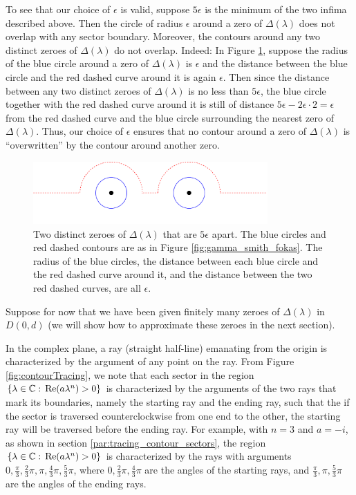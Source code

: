 \documentclass[11pt, oneside, a4paper]{article}
\begin{document}
To see that our choice of $\epsilon$ is valid, suppose $5\epsilon$ is the minimum of the two infima described above. Then the circle of radius $\epsilon$ around a zero of $\Delta(\lambda)$ does not overlap with any sector boundary. Moreover, the contours around any two distinct zeroes of $\Delta(\lambda)$ do not overlap. Indeed: In Figure \ref{fig:epsilon}, suppose the radius of the blue circle around a zero of $\Delta(\lambda)$ is $\epsilon$ and the distance between the blue circle and the red dashed curve around it is again $\epsilon$. Then since the distance between any two distinct zeroes of $\Delta(\lambda)$ is no less than $5\epsilon$, the blue circle together with the red dashed curve around it is still of distance $5\epsilon-2\epsilon\cdot 2 = \epsilon$ from the red dashed curve and the blue circle surrounding the nearest zero of $\Delta(\lambda)$. Thus, our choice of $\epsilon$ ensures that no contour around a zero of $\Delta(\lambda)$ is ``overwritten'' by the contour around another zero.

\begin{figure}[htpb!]
    \centering
    \includegraphics[width=0.8\textwidth]{epsilon_ps.png}
    \caption{Two distinct zeroes of $\Delta(\lambda)$ that are $5\epsilon$ apart. The blue circles and red dashed contours are as in Figure \ref{fig:gamma_smith_fokas}. The radius of the blue circles, the distance between each blue circle and the red dashed curve around it, and the distance between the two red dashed curves, are all $\epsilon$.}
    \label{fig:epsilon}
\end{figure}

Suppose for now that we have been given finitely many zeroes of $\Delta(\lambda)$ in $D(0, d)$ (we will show how to approximate these zeroes in the next section).

In the complex plane, a ray (straight half-line) emanating from the origin is characterized by the argument of any point on the ray. From Figure \ref{fig:contourTracing}, we note that each sector in the region $\{\lambda\in\mathbb C:\, \mathrm{Re}(a\lambda^n)>0\}$ is characterized by the arguments of the two rays that mark its boundaries, namely the starting ray and the ending ray, such that the if the sector is traversed counterclockwise from one end to the other, the starting ray will be traversed before the ending ray. For example, with $n=3$ and $a=-i$, as shown in section \ref{par:tracing_contour_sectors}, the region $\{\lambda\in\mathbb C:\, \mathrm{Re}(a\lambda^n)>0\}$ is characterized by the rays with arguments $0, \frac{\pi}{3}, \frac{2}{3}\pi, \pi, \frac{4}{3}\pi, \frac{5}{3}\pi$, where $0, \frac{2}{3}\pi, \frac{4}{3}\pi$ are the angles of the starting rays, and $\frac{\pi}{3}, \pi, \frac{5}{3}\pi$ are the angles of the ending rays. 
\end{document}
